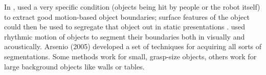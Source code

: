 %



%


\ifverbose
%
In , used
a very specific condition (objects being hit by
people or the robot itself) to extract good
motion-based object boundaries; surface features
of the object could then be used to segregate that
object out in static presentations \cite{fitzpatrick03object}.
 used rhythmic motion
of objects to segment their boundaries both in
visually and acoustically.
%
Arsenio (2005) developed a set of techniques for acquiring all
sorts of segmentations.  Some methods work for small, grasp-size
objects, others work for large background objects like walls or
tables.
\fi


